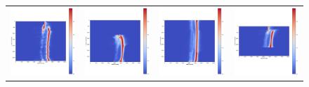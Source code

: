 \begin{figure}
    \centering
    \begin{tabular}{cccc}
        \includegraphics[width=.22\linewidth]{generated/770c_pag_hist_2d_z.pdf} &
        \includegraphics[width=.22\linewidth]{generated/770c_pag_hist_2d_y.pdf} &
        \includegraphics[width=.22\linewidth]{generated/770c_pag_hist_2d_x.pdf} &
        \includegraphics[width=.22\linewidth]{generated/770c_pag_hist_2d_r.pdf} \\

\end{tabular}
\end{figure}
